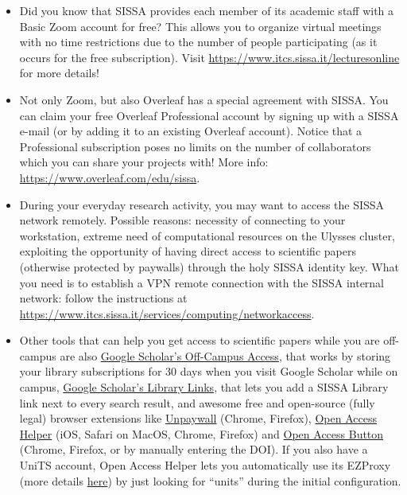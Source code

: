 \documentclass{sissavademecum}
\begin{document}
\begin{itemize}
	\item Did you know that SISSA provides each member of its academic staff with a Basic Zoom account for free? This allows you to organize virtual meetings with no time restrictions due to the number of people participating (as it occurs for the free subscription). Visit \url{https://www.itcs.sissa.it/lecturesonline} for more details!
	
	\item Not only Zoom, but also Overleaf has a special agreement with SISSA. You can claim your free Overleaf Professional account by signing up with a SISSA e-mail (or by adding it to an existing Overleaf account). Notice that a Professional subscription poses no limits on the number of collaborators which you can share your projects with! More info: \url{https://www.overleaf.com/edu/sissa}.
	
	\item During your everyday research activity, you may want to access the SISSA network remotely. Possible reasons: necessity of connecting to your workstation, extreme need of computational resources on the Ulysses cluster, exploiting the opportunity of having direct access to scientific papers (otherwise protected by paywalls) through the holy SISSA identity key. What you need is to establish a VPN remote connection with the SISSA internal network: follow the instructions at \url{https://www.itcs.sissa.it/services/computing/networkaccess}.
	
	\item Other tools that can help you get access to scientific papers while you are off-campus are also \href{https://scholar.google.com/intl/en/scholar/help.html\#access}{Google Scholar's Off-Campus Access}, that works by storing your library subscriptions for 30 days when you visit Google Scholar while on campus, \href{https://scholar.google.com/scholar_settings?sciifh=1\&as_sdt=0,5\#2}{Google Scholar's Library Links}, that lets you add a SISSA Library link next to every search result, and awesome free and open-source (fully legal) browser extensions like \href{https://unpaywall.org}{Unpaywall} (Chrome, Firefox), \href{https://www.oahelper.org}{Open Access Helper} (iOS, Safari on MacOS, Chrome, Firefox) and \href{https://openaccessbutton.org}{Open Access Button} (Chrome, Firefox, or by manually entering the DOI). If you also have a UniTS account, Open Access Helper lets you automatically use its EZProxy (more details \href{https://www.oahelper.org/ezproxy/}{here}) by just looking for ``units'' during the initial configuration.
	

\end{itemize}
\end{document}
